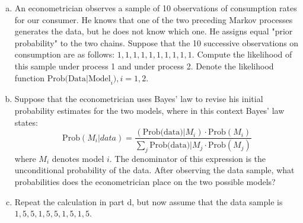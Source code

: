 \documentclass{homework}
\begin{document}
\begin{homeworkProblem}[Problem 2.3]
\begin{enumerate}[a.]
    \item An econometrician observes a sample of 10 observations of consumption rates for our consumer. He knows that one of the two preceding Markov processes generates the data, but he does not know which one. He assigns equal "prior probability" to the two chains. Suppose that the 10 successive observations on consumption are as follows: $1, 1, 1, 1, 1, 1, 1, 1, 1, 1$. Compute the likelihood of this sample under process 1 and under process 2. Denote the likelihood function $\text{Prob(Data|Model}_i), i = 1, 2$.

    \item Suppose that the econometrician uses Bayes' law to revise his initial probability estimates for the two models, where in this context Bayes' law states: $$\text{Prob}(M_i|data) = \frac{\left( \text{Prob(data)}|M_i\right) \cdot \text{Prob}(M_i)}{\sum_j \text{Prob(data)}|M_j \cdot \text{Prob}(M_j)}$$ where $M_i$ denotes model $i$. The denominator of this expression is the unconditional probability of the data. After observing the data sample, what probabilities does the econometrician place on the two possible models?

    \item Repeat the calculation in part d, but now assume that the data sample is $1, 5, 5, 1, 5, 5, 1, 5, 1, 5$.
  \end{enumerate}

  \vspace{.2in}

\end{homeworkProblem}
\end{document}
